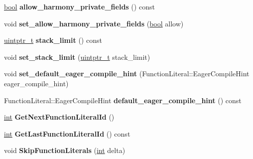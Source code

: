 \begin{DoxyCompactItemize}
\mbox{\hyperlink{classbool}{bool}} {\bfseries allow\+\_\+harmony\+\_\+private\+\_\+fields} () const
\item 
\mbox{\label{classv8_1_1internal_1_1ParserBase_aec573fa1ae686f897c9ca4f6a2d1082f}} 
void {\bfseries set\+\_\+allow\+\_\+harmony\+\_\+private\+\_\+fields} (\mbox{\hyperlink{classbool}{bool}} allow)
\item 
\mbox{\label{classv8_1_1internal_1_1ParserBase_af2a0ccb6059b06ab96bf4562eea5d2ad}} 
\mbox{\hyperlink{classuintptr__t}{uintptr\+\_\+t}} {\bfseries stack\+\_\+limit} () const
\item 
\mbox{\label{classv8_1_1internal_1_1ParserBase_afded9c34b22f944df148e089c77b020f}} 
void {\bfseries set\+\_\+stack\+\_\+limit} (\mbox{\hyperlink{classuintptr__t}{uintptr\+\_\+t}} stack\+\_\+limit)
\item 
\mbox{\label{classv8_1_1internal_1_1ParserBase_a4cae8ca4b3f3185140527e1587fa9447}} 
void {\bfseries set\+\_\+default\+\_\+eager\+\_\+compile\+\_\+hint} (Function\+Literal\+::\+Eager\+Compile\+Hint eager\+\_\+compile\+\_\+hint)
\item 
\mbox{\label{classv8_1_1internal_1_1ParserBase_ae59cc06ad15586e11fc86da3c9571d85}} 
Function\+Literal\+::\+Eager\+Compile\+Hint {\bfseries default\+\_\+eager\+\_\+compile\+\_\+hint} () const
\item 
\mbox{\label{classv8_1_1internal_1_1ParserBase_a8e5ab645bee39ea4e9beebcf04121b07}} 
\mbox{\hyperlink{classint}{int}} {\bfseries Get\+Next\+Function\+Literal\+Id} ()
\item 
\mbox{\label{classv8_1_1internal_1_1ParserBase_a87cbc2fa214248ad9f9800137262c57f}} 
\mbox{\hyperlink{classint}{int}} {\bfseries Get\+Last\+Function\+Literal\+Id} () const
\item 
\mbox{\label{classv8_1_1internal_1_1ParserBase_a9de640b27e75bfd309b4101784c45a33}} 
void {\bfseries Skip\+Function\+Literals} (\mbox{\hyperlink{classint}{int}} delta)

\end{DoxyCompactItemize}
